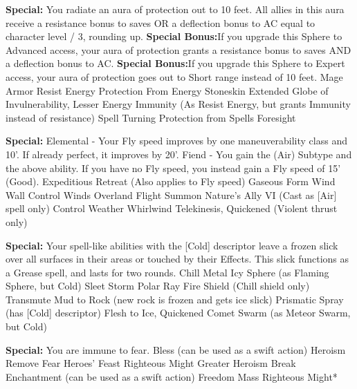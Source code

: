 \begin{multicols}{2}

\textbf{Special: }{You radiate an aura of protection out to 10 feet. All allies in this aura receive a resistance bonus to saves OR a deflection bonus to AC equal to character level / 3, rounding up.}
\textbf{Special Bonus:}{If you upgrade this Sphere to Advanced access, your aura of protection grants a resistance bonus to saves AND a deflection bonus to AC.}
\textbf{Special Bonus:}{If you upgrade this Sphere to Expert access, your aura of protection goes out to Short range instead of 10 feet.}
\sphere
{Mage Armor}
{Resist Energy}
{Protection From Energy}
{Stoneskin}
{Extended Globe of Invulnerability, Lesser}
{Energy Immunity (As Resist Energy, but grants Immunity instead of resistance)}
{Spell Turning}
{Protection from Spells}
{Foresight}

\textbf{Special: }{Elemental - Your Fly speed improves by one maneuverability class and 10'. If already perfect, it improves by 20'. Fiend - You gain the (Air) Subtype and the above ability. If you have no Fly speed, you instead gain a Fly speed of 15' (Good).}
\sphere
{Expeditious Retreat (Also applies to Fly speed)}
{Gaseous Form}
{Wind Wall}
{Control Winds}
{Overland Flight}
{Summon Nature's Ally VI (Cast as [Air] spell only)}
{Control Weather}
{Whirlwind}
{Telekinesis, Quickened (Violent thrust only)}

\textbf{Special: }{Your spell-like abilities with the [Cold] descriptor leave a frozen slick over all surfaces in their areas or touched by their Effects. This slick functions as a Grease spell, and lasts for two rounds.}
\sphere
{Chill Metal}
{Icy Sphere (as Flaming Sphere, but Cold)}
{Sleet Storm}
{Polar Ray}
{Fire Shield (Chill shield only)}
{Transmute Mud to Rock (new rock is frozen and gets ice slick)}
{Prismatic Spray (has [Cold] descriptor)}
{Flesh to Ice, Quickened}
{Comet Swarm (as Meteor Swarm, but Cold)}

\textbf{Special: }{You are immune to fear.}
\sphere
{Bless (can be used as a swift action)}
{Heroism}
{Remove Fear}
{Heroes' Feast}
{Righteous Might}
{Greater Heroism}
{Break Enchantment (can be used as a swift action)}
{Freedom}
{Mass Righteous Might*}


\end{multicols}
